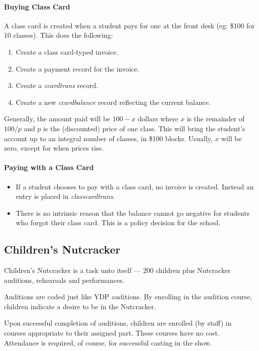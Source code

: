\documentclass[11pt]{article}
\begin{document}
\paragraph{Buying Class Card}

A class card is created when a student pays for one at the front desk (eg: \$100 for 10 classes).  This does the following:
 \begin{enumerate}
 \item Create a class card-typed invoice.
 \item Create a payment record for the invoice.
 \item Create a \emph{ccardtrans} record.
 \item Create a new \emph{ccardbalance} record reflecting the current balance.
 \end{enumerate}

Generally, the amount paid will be $100-x$ dollars where $x$ is the remainder of $100 / p$ and $p$ is the (discounted) price of one class.  This will bring the student's account up to an integral number of classes, in \$100 blocks.  Usually, $x$ will be zero, except for when prices rise.

\paragraph{Paying with a Class Card}

 \begin{itemize}
 \item If a student chooses to pay with a class card, no invoice is created.  Instead an entry is placed in \emph{classcardtrans}.
 \item There is no intrinsic reason that the balance cannot go negative for students who forgot their class card.  This is a policy decision for the school.
 \end{itemize}

\subsection{Children's Nutcracker}

Children's Nutcracker is a task unto itself --- 200 children plus Nutcracker auditions, rehearsals and performances.

Auditions are coded just like YDP auditions.  By enrolling in the
audition course, children indicate a desire to be in the Nutcracker.

Upon successful completion of auditions, children are enrolled (by
staff) in courses appropriate to their assigned part.  These courses
have no cost.  Attendance is required, of course, for successful
casting in the show.
\end{document}
